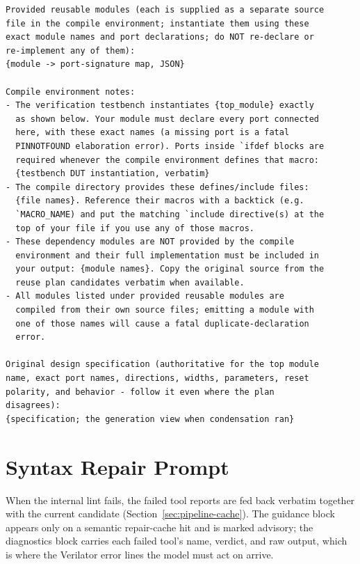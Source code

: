 \begin{lstlisting}[language={},caption={The shared context block. The
first three environment notes appear when the task provides the
corresponding files; the specification is swapped for the
diagnostic-driven slice in repair prompts when slicing is
on.},label={lst:gen-context}]
Provided reusable modules (each is supplied as a separate source
file in the compile environment; instantiate them using these
exact module names and port declarations; do NOT re-declare or
re-implement any of them):
{module -> port-signature map, JSON}

Compile environment notes:
- The verification testbench instantiates {top_module} exactly
  as shown below. Your module must declare every port connected
  here, with these exact names (a missing port is a fatal
  PINNOTFOUND elaboration error). Ports inside `ifdef blocks are
  required whenever the compile environment defines that macro:
  {testbench DUT instantiation, verbatim}
- The compile directory provides these defines/include files:
  {file names}. Reference their macros with a backtick (e.g.
  `MACRO_NAME) and put the matching `include directive(s) at the
  top of your file if you use any of those macros.
- These dependency modules are NOT provided by the compile
  environment and their full implementation must be included in
  your output: {module names}. Copy the original source from the
  reuse plan candidates verbatim when available.
- All modules listed under provided reusable modules are
  compiled from their own source files; emitting a module with
  one of those names will cause a fatal duplicate-declaration
  error.

Original design specification (authoritative for the top module
name, exact port names, directions, widths, parameters, reset
polarity, and behavior - follow it even where the plan
disagrees):
{specification; the generation view when condensation ran}
\end{lstlisting}

\section{Syntax Repair Prompt}
\label{app:syntax-repair}

When the internal lint fails, the failed tool reports are fed back
verbatim together with the current candidate
(Section~\ref{sec:pipeline-cache}). The guidance block appears only on a
semantic repair-cache hit and is marked advisory; the diagnostics block
carries each failed tool's name, verdict, and raw output, which is where
the Verilator error lines the model must act on arrive.

